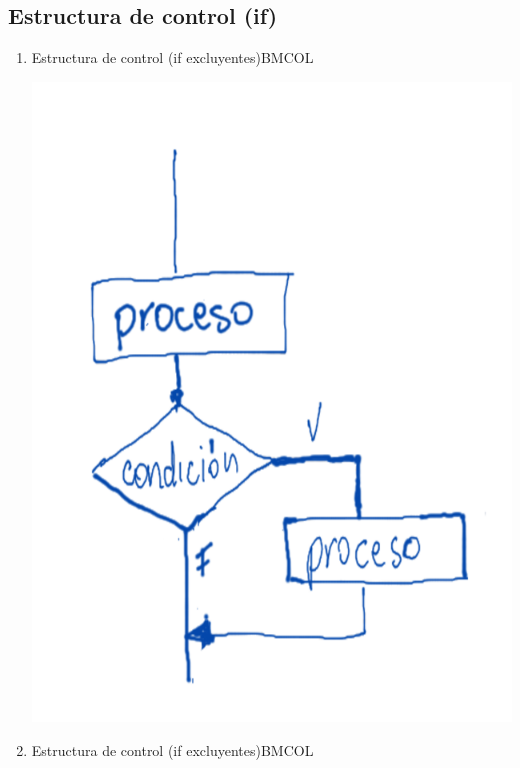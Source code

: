 \documentclass[presentation, aspectratio=54]{beamer}
\begin{document}
\subsection{Estructura de control (if)}
\label{sec:org1d577c7}
\begin{enumerate}
\item Estructura de control (if excluyentes)\hfill{}\textsc{BMCOL}
\label{sec:org1a4f99f}
\begin{center}
\includegraphics[width=.9\linewidth]{./images/codigo/if.png}
\end{center}
\item Estructura de control (if excluyentes)\hfill{}\textsc{BMCOL}
\label{sec:orgb0d71b0}
\begin{center}

\end{center}
\end{enumerate}
\end{document}
